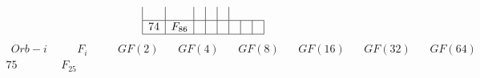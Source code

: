 \documentclass{article}
\begin{document}
{$$\begin{array}{|r|*{7}{r|}}
 & 
 & 
 & 
 & 
\\
\hline
74 
 & F_{86} &
 & 
 & 
 & 
 & 
 & 
\\
\hline
\end{array}
$$
$$
\begin{array}{|r|*{7}{r|}}
\hline
\ \ Orb-i \ \ &\ \ \quad F_i \quad \ \   &\ \ GF(2)\ \ &\ \ GF(4)\ \ &\ \ GF(8)\ \ &\ \ GF(16)\ \ &\ \ GF(32)\ \ &\ \ GF(64)\ \ \\
\hline
75 
 & F_{25} &
 & 
 & 
 & 

\end{array}$$}
\end{document}
